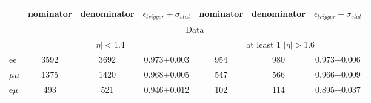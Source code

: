 

\begin{tabular}{l|c|c|c|c|c|c}     

 & nominator & denominator & $\epsilon_{trigger} \pm \sigma_{stat}$ &  nominator & denominator & $\epsilon_{trigger} \pm \sigma_{stat}$  \\    
\hline

&\multicolumn{6}{c}{Data} \\
\hline
&  \multicolumn{3}{c|}{$|\eta|<1.4$ } & \multicolumn{3}{|c}{ at least 1 $|\eta| > 1.6$ }\\
\hline
ee & 3592 & 3692 & 0.973$\pm$0.003 & 954 & 980 & 0.973$\pm$0.006 \\
$\mu\mu$ & 1375 & 1420 & 0.968$\pm$0.005 & 547 & 566 & 0.966$\pm$0.009 \\
e$\mu$ & 493 & 521 & 0.946$\pm$0.012 & 102 & 114 & 0.895$\pm$0.037 \\
 
 
\end{tabular}  

